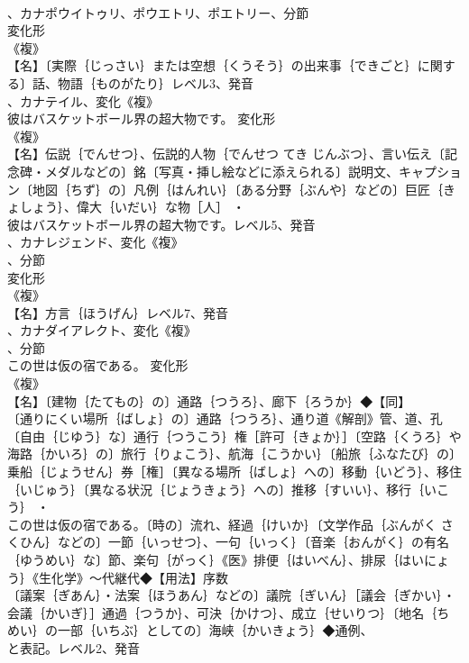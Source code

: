 \documentclass[8pt]{extreport}
\begin{document}
\begin{CJK}{UTF8}{min}
\\	、カナポウイトゥリ、ポウエトリ、ポエトリー、分節
\\	変化形 
\\	《複》
\\	【名】〔実際｛じっさい｝または空想｛くうそう｝の出来事｛できごと｝に関する〕話、物語｛ものがたり｝レベル3、発音
\\	、カナテイル、変化《複》
\\	彼はバスケットボール界の超大物です。	変化形 
\\	《複》
\\	【名】伝説｛でんせつ｝、伝説的人物｛でんせつ てき じんぶつ｝、言い伝え〔記念碑・メダルなどの〕銘〔写真・挿し絵などに添えられる〕説明文、キャプション〔地図｛ちず｝の〕凡例｛はんれい｝〔ある分野｛ぶんや｝などの〕巨匠｛きょしょう｝、偉大｛いだい｝な物［人］ ・
\\	彼はバスケットボール界の超大物です。レベル5、発音
\\	、カナレジェンド、変化《複》
\\	、分節
\\	変化形 
\\	《複》
\\	【名】方言｛ほうげん｝レベル7、発音
\\	、カナダイアレクト、変化《複》
\\	、分節
\\	この世は仮の宿である。	変化形 
\\	《複》
\\	【名】〔建物｛たてもの｝の〕通路｛つうろ｝、廊下｛ろうか｝◆【同】
\\	〔通りにくい場所｛ばしょ｝の〕通路｛つうろ｝、通り道《解剖》管、道、孔〔自由｛じゆう｝な〕通行｛つうこう｝権［許可｛きょか｝］〔空路｛くうろ｝や海路｛かいろ｝の〕旅行｛りょこう｝、航海｛こうかい｝〔船旅｛ふなたび｝の〕乗船｛じょうせん｝券［権］〔異なる場所｛ばしょ｝への〕移動｛いどう｝、移住｛いじゅう｝〔異なる状況｛じょうきょう｝への〕推移｛すいい｝、移行｛いこう｝ ・
\\	この世は仮の宿である。〔時の〕流れ、経過｛けいか｝〔文学作品｛ぶんがく さくひん｝などの〕一節｛いっせつ｝、一句｛いっく｝〔音楽｛おんがく｝の有名｛ゆうめい｝な〕節、楽句｛がっく｝《医》排便｛はいべん｝、排尿｛はいにょう｝《生化学》～代継代◆【用法】序数 
\\	〔議案｛ぎあん｝・法案｛ほうあん｝などの〕議院｛ぎいん｝［議会｛ぎかい｝・会議｛かいぎ｝］通過｛つうか｝、可決｛かけつ｝、成立｛せいりつ｝〔地名｛ちめい｝の一部｛いちぶ｝としての〕海峡｛かいきょう｝◆通例、
\\	と表記。レベル2、発音

\end{CJK}
\end{document}
